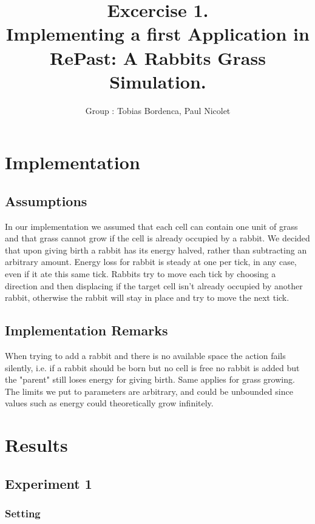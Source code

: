 \documentclass[11pt]{article}
\title{\bf Excercise 1.\\ Implementing a first Application in RePast: A Rabbits Grass Simulation.}
\author{Group \textnumero 1: Tobias Bordenca, Paul Nicolet}
\begin{document}
\maketitle

\section{Implementation}

\subsection{Assumptions}
In our implementation we assumed that each cell can contain one unit of grass and that grass cannot grow if the cell is already occupied by a rabbit. We decided that upon giving birth a rabbit has its energy halved, rather than subtracting an arbitrary amount. Energy loss for rabbit is steady at one per tick, in any case, even if it ate this same tick. Rabbits try to move each tick by choosing a direction and then displacing if the target cell isn't already occupied by another rabbit, otherwise the rabbit will stay in place and try to move the next tick.

\subsection{Implementation Remarks}
When trying to add a rabbit and there is no available space the action fails silently, i.e. if a rabbit should be born but no cell is free no rabbit is added but the "parent" still loses energy for giving birth. Same applies for grass growing. \\
The limits we put to parameters are arbitrary, and could be unbounded since values such as energy could theoretically grow infinitely.

\section{Results}

\subsection{Experiment 1}

\subsubsection{Setting}
\end{document}
